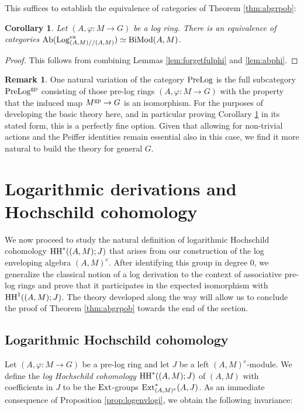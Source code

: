 \documentclass[a4paper,10pt%
]{amsart}
\numberwithin{equation}{section}
\newtheorem{corollary}[subsection]{Corollary}
\theoremstyle{definition}
\newtheorem{remark}[subsection]{Remark}
\renewcommand{\:}{\colon}
\begin{document}
\noindent This suffices to establish the equivalence of categories of Theorem \ref{thm:abgrpob}:

\begin{corollary}\label{cor:abgrpob} Let $(A, \varphi \colon M \to G)$ be a log ring. There is an equivalence of categories ${\rm Ab}({\rm Log}^{\rm ex}_{(A, M) // (A, M)}) \simeq {\rm BiMod}(A, M)$. 
\end{corollary}

\begin{proof} This follows from combining Lemmas \ref{lem:forgetfulphi} and \ref{lem:abphi}. 
\end{proof}

\begin{remark}\label{rem:diffalt} One natural variation of the category ${\rm PreLog}$ is the full subcategory ${\rm PreLog}^{\rm gp}$ consisting of those pre-log rings $(A, \varphi \colon M \to G)$ with the property that the induced map $M^{\rm gp} \to G$ is an isomorphism. For the purposes of developing the basic theory here, and in particular proving Corollary \ref{cor:abgrpob} in its stated form, this is a perfectly fine option. Given that allowing for non-trivial actions and the Peiffer identities remain essential also in this case, we find it more natural to build the theory for general $G$. 
\end{remark}

\section{Logarithmic derivations and Hochschild cohomology}\label{sec:loghch} We now proceed to study the natural definition of logarithmic Hochschild cohomology ${\rm HH}^*((A, M) ; J)$ that arises from our construction of the log enveloping algebra $(A, M)^e$. After identifying this group in degree $0$, we generalize the classical notion of a log derivation to the context of associative pre-log rings and prove that it participates in the expected isomorphism with ${\rm HH}^1((A, M) ; J)$. The theory developed along the way will allow us to conclude the proof of Theorem \ref{thm:abgrpob} towards the end of the section. 

\subsection{Logarithmic Hochschild cohomology} Let $(A, \varphi \colon M \to G)$ be a pre-log ring and let $J$ be a left $(A, M)^e$-module. We define the \emph{log Hochschild cohomology} ${\rm HH}^*((A, M) ; J)$ of $(A, M)$ with coefficients in $J$ to be the ${\rm Ext}$-groups ${\rm Ext}^*_{(A, M)^e}(A, J)$. As an immediate consequence of Proposition \ref{prop:logenvlogi}, we obtain the following invariance: 
\end{document}
